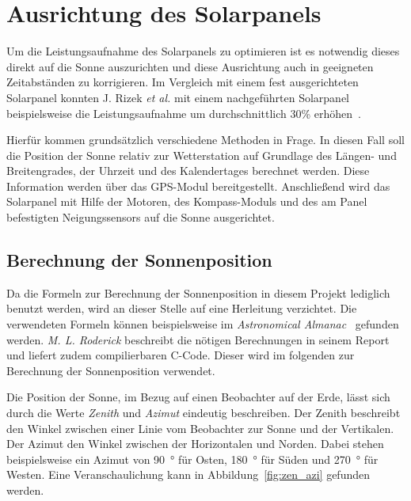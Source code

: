 
\section{Ausrichtung des Solarpanels}\label{sec:ausrichtung des Solarpanels}
Um die Leistungsaufnahme des Solarpanels zu optimieren ist es notwendig dieses direkt auf die Sonne auszurichten und diese Ausrichtung auch in geeigneten Zeitabständen zu korrigieren. Im Vergleich mit einem fest ausgerichteten Solarpanel konnten J. Rizek \emph{et al.} mit einem nachgeführten Solarpanel beispielsweise die Leistungsaufnahme um durchschnittlich 30\% erhöhen~\cite{Rizek2008}.

Hierfür kommen grundsätzlich verschiedene Methoden in Frage. In diesen Fall soll die Position der Sonne relativ zur Wetterstation auf Grundlage des Längen- und Breitengrades, der Uhrzeit und des Kalendertages berechnet werden. Diese Information werden über das GPS-Modul bereitgestellt. Anschließend wird das Solarpanel mit Hilfe der Motoren, des Kompass-Moduls und des am Panel befestigten Neigungssensors auf die Sonne ausgerichtet.

\subsection{Berechnung der Sonnenposition}\label{sec:berechnung_der_sonnenposition}
Da die Formeln zur Berechnung der Sonnenposition in diesem Projekt lediglich benutzt werden, wird an dieser Stelle auf eine Herleitung verzichtet. Die verwendeten Formeln können beispielsweise im \emph{Astronomical Almanac}~\cite{Anon1984} gefunden werden. \emph{M. L. Roderick} beschreibt die nötigen Berechnungen in seinem Report~\cite{Roderick1992} und liefert zudem compilierbaren C-Code. Dieser wird im folgenden zur Berechnung der Sonnenposition verwendet.

Die Position der Sonne, im Bezug auf einen Beobachter auf der Erde, lässt sich durch die Werte \emph{Zenith} und \emph{Azimut} eindeutig beschreiben. Der Zenith beschreibt den Winkel zwischen einer Linie vom Beobachter zur Sonne und der Vertikalen. Der Azimut den Winkel zwischen der Horizontalen und Norden. Dabei stehen beispielsweise ein Azimut von \SI{90}{\degree} für Osten, \SI{180}{\degree} für Süden und \SI{270}{\degree} für Westen. Eine Veranschaulichung kann in Abbildung~\ref{fig:zen_azi} gefunden werden.

